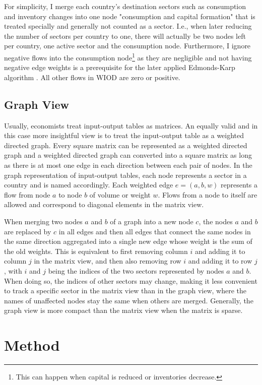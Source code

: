 \documentclass[english]{uzhpub}
\begin{document}
For simplicity, I merge each country's destination sectors such as consumption and inventory changes into one node "consumption and capital formation" that is treated specially and generally not counted as a sector. I.e., when later reducing the number of sectors per country to one, there will actually be two nodes left per country, one active sector and the consumption node. Furthermore, I ignore negative flows into the consumption node\footnote{This can happen when capital is reduced or inventories decrease.} as they are negligible and not having negative edge weights is a prerequisite for the later applied Edmonds-Karp algorithm \cite{edmonds1972theoretical}. All other flows in WIOD are zero or positive.

\subsection{Graph View}
\label{sec:graphview}
Usually, economists treat input-output tables as matrices. An equally valid and in this case more insightful view is to treat the input-output table as a weighted directed graph. Every square matrix can be represented as a weighted directed graph and a weighted directed graph can converted into a square matrix as long as there is at most one edge in each direction between each pair of nodes. In the graph representation of input-output tables, each node represents a sector in a country and is named accordingly. Each weighted edge $e=(a, b, w)$ represents a flow from node $a$ to node $b$ of volume or weight $w$. Flows from a node to itself are allowed and correspond to diagonal elements in the matrix view.

When merging two nodes $a$ and $b$ of a graph into a new node $c$, the nodes $a$ and $b$ are replaced by $c$ in all edges and then all edges that connect the same nodes in the same direction aggregated into a single new edge whose weight is the sum of the old weights. This is equivalent to first removing column $i$ and adding it to column $j$ in the matrix view, and then also removing row $i$ and adding it to row $j$, with $i$ and $j$ being the indices of the two sectors represented by nodes $a$ and $b$. When doing so, the indices of other sectors may change, making it less convenient to track a specific sector in the matrix view than in the graph view, where the names of unaffected nodes stay the same when others are merged. Generally, the graph view is more compact than the matrix view when the matrix is sparse.

\section{Method}
\label{sec:method}
\end{document}
